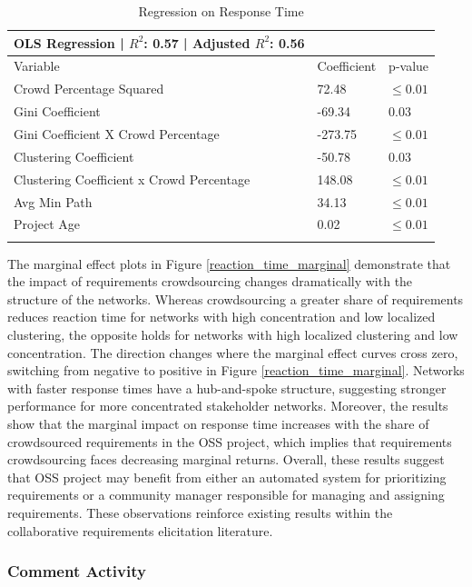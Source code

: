 \begin{table}
\caption{Regression on Response Time}
\label{reaction_time_regression}
\begin{tabular}{lll}
OLS Regression | $R^2$: 0.57 | Adjusted $R^2$: 0.56 \\
\hline\noalign{\smallskip}
Variable & Coefficient & p-value  \\
\noalign{\smallskip}\hline\noalign{\smallskip}
Crowd Percentage Squared & 72.48 & $\leq 0.01$ \\
Gini Coefficient & -69.34 & 0.03 \\
Gini Coefficient X Crowd Percentage & -273.75 & $\leq 0.01$ \\
Clustering Coefficient & -50.78 & 0.03 \\
Clustering Coefficient x Crowd Percentage & 148.08 & $\leq 0.01$ \\
Avg Min Path & 34.13 & $\leq 0.01$ \\
Project Age & 0.02 & $\leq 0.01$ \\
\noalign{\smallskip}\hline
\end{tabular}
\end{table}

The marginal effect plots in Figure \ref{reaction_time_marginal} demonstrate that the impact of requirements crowdsourcing changes dramatically with the structure of the networks. Whereas crowdsourcing a greater share of requirements reduces reaction time for networks with high concentration and low localized clustering, the opposite holds for networks with high localized clustering and low concentration. The direction changes where the marginal effect curves cross zero, switching from negative to positive in Figure \ref{reaction_time_marginal}. Networks with faster response times have a hub-and-spoke structure, suggesting stronger performance for more concentrated stakeholder networks. Moreover, the results show that the marginal impact on response time increases with the share of crowdsourced requirements in the OSS project, which implies that requirements crowdsourcing faces decreasing marginal returns. Overall, these results suggest that OSS project may benefit from either an automated system for prioritizing requirements or a community manager responsible for managing and assigning requirements. These observations reinforce existing results \cite{stakesource, stakerare, lim, mobasher} within the collaborative requirements elicitation literature.

\subsubsection{Comment Activity}
\label{comment_activity}

